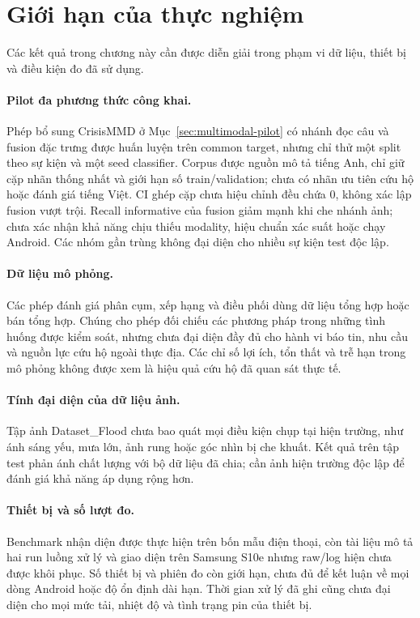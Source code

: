 \section{Giới hạn của thực nghiệm}\label{sec:04-evaluation-limitations}
Các kết quả trong chương này cần được diễn giải trong phạm vi dữ liệu, thiết bị và điều kiện đo đã sử dụng.

\paragraph{Pilot đa phương thức công khai.}
Phép bổ sung CrisisMMD ở Mục~\ref{sec:multimodal-pilot} có nhánh đọc câu và fusion đặc trưng được huấn luyện trên common target, nhưng chỉ thử một split theo sự kiện và một seed classifier. Corpus được nguồn mô tả tiếng Anh, chỉ giữ cặp nhãn thống nhất và giới hạn số train/validation; chưa có nhãn ưu tiên cứu hộ hoặc đánh giá tiếng Việt. CI ghép cặp chưa hiệu chỉnh đều chứa 0, không xác lập fusion vượt trội. Recall informative của fusion giảm mạnh khi che nhánh ảnh; chưa xác nhận khả năng chịu thiếu modality, hiệu chuẩn xác suất hoặc chạy Android. Các nhóm gần trùng không đại diện cho nhiều sự kiện test độc lập.

\paragraph{Dữ liệu mô phỏng.}
Các phép đánh giá phân cụm, xếp hạng và điều phối dùng dữ liệu tổng hợp hoặc bán tổng hợp. Chúng cho phép đối chiếu các phương pháp trong những tình huống được kiểm soát, nhưng chưa đại diện đầy đủ cho hành vi báo tin, nhu cầu và nguồn lực cứu hộ ngoài thực địa. Các chỉ số lợi ích, tổn thất và trễ hạn trong mô phỏng không được xem là hiệu quả cứu hộ đã quan sát thực tế.

\paragraph{Tính đại diện của dữ liệu ảnh.}
Tập ảnh Dataset\_Flood chưa bao quát mọi điều kiện chụp tại hiện trường, như ánh sáng yếu, mưa lớn, ảnh rung hoặc góc nhìn bị che khuất. Kết quả trên tập test phản ánh chất lượng với bộ dữ liệu đã chia; cần ảnh hiện trường độc lập để đánh giá khả năng áp dụng rộng hơn.

\paragraph{Thiết bị và số lượt đo.}
Benchmark nhận diện được thực hiện trên bốn mẫu điện thoại, còn tài liệu mô tả hai run luồng xử lý và giao diện trên Samsung S10e nhưng raw/log hiện chưa được khôi phục. Số thiết bị và phiên đo còn giới hạn, chưa đủ để kết luận về mọi dòng Android hoặc độ ổn định dài hạn. Thời gian xử lý đã ghi cũng chưa đại diện cho mọi mức tải, nhiệt độ và tình trạng pin của thiết bị.

